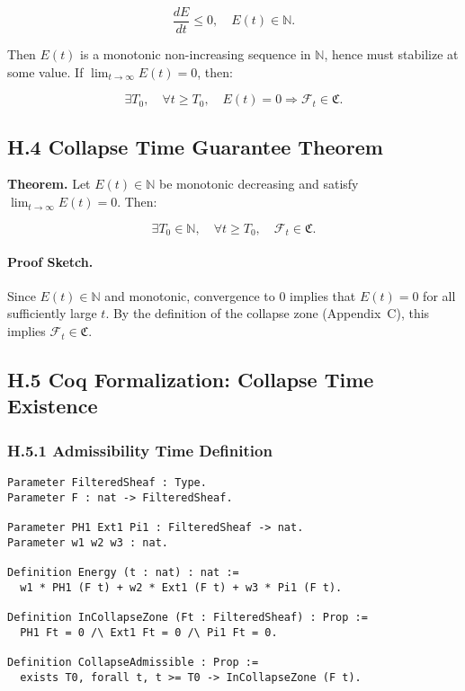 \documentclass[11pt]{article}
\begin{document}
\[
\frac{dE}{dt} \leq 0,\quad E(t) \in \mathbb{N}.
\]

Then \( E(t) \) is a monotonic non-increasing sequence in \( \mathbb{N} \), hence must stabilize at some value. If \( \lim_{t \to \infty} E(t) = 0 \), then:

\[
\exists T_0,\quad \forall t \geq T_0,\quad E(t) = 0 \Rightarrow \mathcal{F}_t \in \mathfrak{C}.
\]

\subsection*{H.4 Collapse Time Guarantee Theorem}

\textbf{Theorem.}  
Let \( E(t) \in \mathbb{N} \) be monotonic decreasing and satisfy \( \lim_{t \to \infty} E(t) = 0 \). Then:

\[
\exists T_0 \in \mathbb{N},\quad \forall t \geq T_0,\quad \mathcal{F}_t \in \mathfrak{C}.
\]

\paragraph{Proof Sketch.}  
Since \( E(t) \in \mathbb{N} \) and monotonic, convergence to 0 implies that \( E(t) = 0 \) for all sufficiently large \( t \). By the definition of the collapse zone (Appendix~C), this implies \( \mathcal{F}_t \in \mathfrak{C} \).

\subsection*{H.5 Coq Formalization: Collapse Time Existence}

\subsubsection*{H.5.1 Admissibility Time Definition}

\begin{lstlisting}[language=Coq, caption=Collapse Time Definition, captionpos=b]
Parameter FilteredSheaf : Type.
Parameter F : nat -> FilteredSheaf.

Parameter PH1 Ext1 Pi1 : FilteredSheaf -> nat.
Parameter w1 w2 w3 : nat.

Definition Energy (t : nat) : nat :=
  w1 * PH1 (F t) + w2 * Ext1 (F t) + w3 * Pi1 (F t).

Definition InCollapseZone (Ft : FilteredSheaf) : Prop :=
  PH1 Ft = 0 /\ Ext1 Ft = 0 /\ Pi1 Ft = 0.

Definition CollapseAdmissible : Prop :=
  exists T0, forall t, t >= T0 -> InCollapseZone (F t).
\end{lstlisting}
\end{document}

